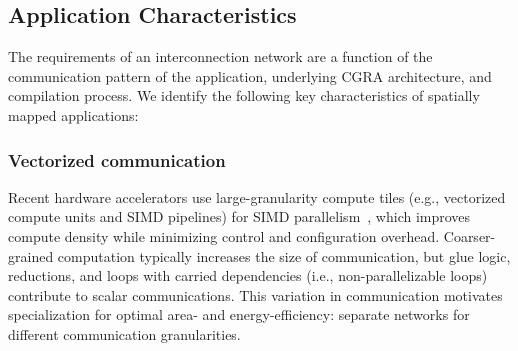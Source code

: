 \subsection{Application Characteristics}
The requirements of an interconnection network are a function of the communication pattern of the
application, underlying CGRA architecture, and compilation process.
We 
identify the following key characteristics of spatially mapped applications:

\subsubsection{Vectorized communication}
Recent hardware accelerators use large-granularity compute tiles (e.g., vectorized compute units and SIMD pipelines) for
SIMD parallelism~\cite{plasticine, xilinx-acap}, which improves compute density while minimizing control and configuration overhead. 
Coarser-grained computation typically increases the size of communication, but glue logic, reductions, and loops with carried dependencies (i.e., non-parallelizable loops) contribute to scalar communications. 
This variation in communication motivates specialization for optimal area- and energy-efficiency: separate networks for different communication granularities.


